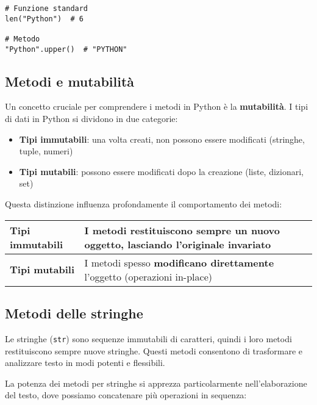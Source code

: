 \begin{lstlisting}[style=pythonstyle]
# Funzione standard
len("Python")  # 6

# Metodo
"Python".upper()  # "PYTHON"
\end{lstlisting}


\subsection*{Metodi e mutabilità}\label{MutabilitàImmutabilità}

Un concetto cruciale per comprendere i metodi in Python è la \textbf{mutabilità}. I tipi di dati in Python si dividono in due categorie:

\begin{itemize}
    \item \textbf{Tipi immutabili}: una volta creati, non possono essere modificati (stringhe, tuple, numeri)
    \item \textbf{Tipi mutabili}: possono essere modificati dopo la creazione (liste, dizionari, set)
\end{itemize}

Questa distinzione influenza profondamente il comportamento dei metodi:

\begin{tcolorbox}[colback=blue!5!white,colframe=blue!75!black,title=Comportamento dei Metodi]
\begin{tabularx}{\textwidth}{|l|X|}
\hline
\textbf{Tipi immutabili} & I metodi \textbf{restituiscono sempre} un nuovo oggetto, lasciando l'originale invariato \\
\hline
\textbf{Tipi mutabili} & I metodi spesso \textbf{modificano direttamente} l'oggetto (operazioni in-place) \\
\hline
\end{tabularx}
\end{tcolorbox}

\subsection*{Metodi delle stringhe}

Le stringhe (\texttt{str}) sono sequenze immutabili di caratteri, quindi i loro metodi restituiscono sempre nuove stringhe. Questi metodi consentono di trasformare e analizzare testo in modi potenti e flessibili.

La potenza dei metodi per stringhe si apprezza particolarmente nell'elaborazione del testo, dove possiamo concatenare più operazioni in sequenza:


